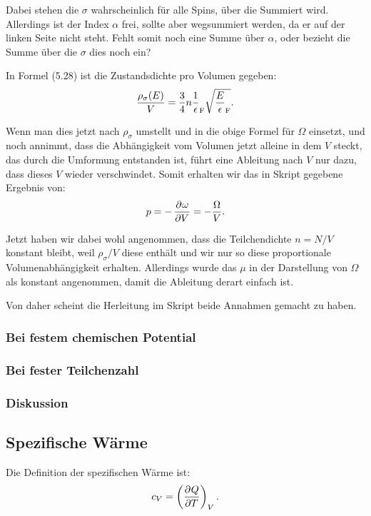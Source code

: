 Dabei stehen die $\sigma$ wahrscheinlich für alle Spins, über die Summiert wird. Allerdings ist der Index $\alpha$ frei, sollte aber wegsummiert werden, da er auf der linken Seite nicht steht. Fehlt somit noch eine Summe über $\alpha$, oder bezieht die Summe über die $\sigma$ dies noch ein?

\newcommand\EF{\epsilon_\text F}

In Formel (5.28) ist die Zustandsdichte pro Volumen gegeben:
\[
    \frac{\rho_\sigma(E)} V = \frac 34 n \frac1\EF \sqrt{\frac E\EF}.
\]

Wenn man dies jetzt nach $\rho_\sigma$ umstellt und in die obige Formel für $\Omega$ einsetzt, und noch annimmt, dass die Abhängigkeit vom Volumen jetzt alleine in dem $V$ steckt, das durch die Umformung entstanden ist, führt eine Ableitung nach $V$ nur dazu, dass dieses $V$ wieder verschwindet. Somit erhalten wir das in Skript gegebene Ergebnis von:
\[
    p = - \dpd \omega V = - \frac \Omega V.
\]

Jetzt haben wir dabei wohl angenommen, dass die Teilchendichte $n = N/V$ konstant bleibt, weil $\rho_\sigma/V$ diese enthält und wir nur so diese proportionale Volumenabhängigkeit erhalten. Allerdings wurde das $\mu$ in der Darstellung von $\Omega$ als konstant angenommen, damit die Ableitung derart einfach ist.

Von daher scheint die Herleitung im Skript beide Annahmen gemacht zu haben.

\subsubsection{Bei festem chemischen Potential}

\fehlt

\subsubsection{Bei fester Teilchenzahl}

\fehlt

\subsubsection{Diskussion}

\fehlt

\subsection{Spezifische Wärme}

Die Definition der spezifischen Wärme ist:
\[
    c_V = \tdpd QTV.
\]

